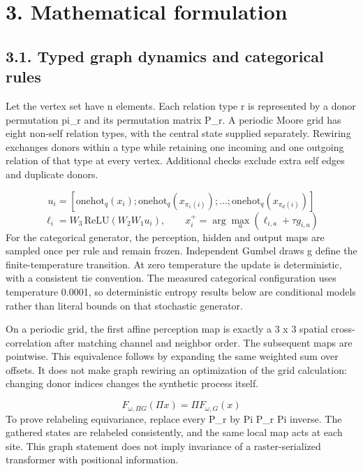 \documentclass[11pt,a4paper]{article}
\begin{document}
\section*{3. Mathematical formulation}
\subsection*{3.1. Typed graph dynamics and categorical rules}
Let the vertex set have n elements. Each relation type r is represented by a donor permutation pi\_\allowbreak{}r and its permutation matrix P\_\allowbreak{}r. A periodic Moore grid has eight non-self relation types, with the central state supplied separately. Rewiring exchanges donors within a type while retaining one incoming and one outgoing relation of that type at every vertex. Additional checks exclude extra self edges and duplicate donors.

\begin{equation}
u_i=[\mathrm{onehot}_q(x_i);\mathrm{onehot}_q(x_{\pi_1(i)});\ldots;\mathrm{onehot}_q(x_{\pi_d(i)})]
\end{equation}
\begin{equation}
\ell_i=W_3\,\mathrm{ReLU}(W_2W_1u_i),\qquad x_i^+=\arg\max_a(\ell_{i,a}+\tau g_{i,a})
\end{equation}
For the categorical generator, the perception, hidden and output maps are sampled once per rule and remain frozen. Independent Gumbel draws g define the finite-temperature transition. At zero temperature the update is deterministic, with a consistent tie convention. The measured categorical configuration uses temperature 0.0001, so deterministic entropy results below are conditional models rather than literal bounds on that stochastic generator.

On a periodic grid, the first affine perception map is exactly a 3 x 3 spatial cross-correlation after matching channel and neighbor order. The subsequent maps are pointwise. This equivalence follows by expanding the same weighted sum over offsets. It does not make graph rewiring an optimization of the grid calculation: changing donor indices changes the synthetic process itself.

\begin{equation}
F_{\omega,\Pi G}(\Pi x)=\Pi F_{\omega,G}(x)
\end{equation}
To prove relabeling equivariance, replace every P\_\allowbreak{}r by Pi P\_\allowbreak{}r Pi inverse. The gathered states are relabeled consistently, and the same local map acts at each site. This graph statement does not imply invariance of a raster-serialized transformer with positional information.
\end{document}
